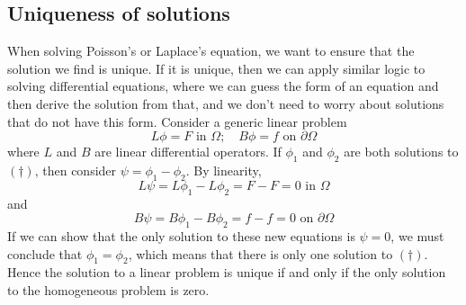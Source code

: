 \subsection{Uniqueness of solutions}
When solving Poisson's or Laplace's equation, we want to ensure that the solution we find is unique.
If it is unique, then we can apply similar logic to solving differential equations, where we can guess the form of an equation and then derive the solution from that, and we don't need to worry about solutions that do not have this form.
Consider a generic linear problem
\begin{equation}
	L\phi = F \text{ in } \Omega;\quad B \phi = f \text{ on } \partial\Omega \tag{\(\dagger\)}
\end{equation}
where \(L\) and \(B\) are linear differential operators.
If \(\phi_1\) and \(\phi_2\) are both solutions to \((\dagger)\), then consider \(\psi = \phi_1 - \phi_2\).
By linearity,
\[
	L\psi = L\phi_1 - L\phi_2 = F - F = 0 \text{ in } \Omega
\]
and
\[
	B\psi = B\phi_1 - B\phi_2 = f - f = 0 \text{ on } \partial\Omega
\]
If we can show that the only solution to these new equations is \(\psi = 0\), we must conclude that \(\phi_1 = \phi_2\), which means that there is only one solution to \((\dagger)\).
Hence the solution to a linear problem is unique if and only if the only solution to the homogeneous problem is zero.

